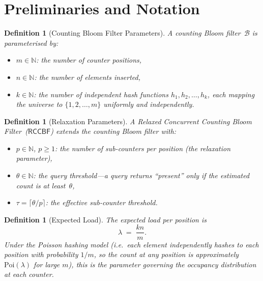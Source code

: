\documentclass[11pt,a4paper]{article}
\newtheorem{definition}[theorem]{Definition}
\newcommand{\RCCBF}{\textsf{RCCBF}}
\newcommand{\Poi}{\mathrm{Poi}}
\newcommand{\N}{\mathbb{N}}
\newcommand{\calB}{\mathcal{B}}
\begin{document}
\section{Preliminaries and Notation}\label{sec:prelims}

\begin{definition}[Counting Bloom Filter Parameters]\label{def:params}
A \emph{counting Bloom filter}~$\calB$ is parameterised by:
\begin{itemize}
  \item $m \in \N$: the number of counter positions,
  \item $n \in \N$: the number of elements inserted,
  \item $k \in \N$: the number of independent hash functions
        $h_1, h_2, \ldots, h_k$, each mapping the universe to
        $\{1,2,\ldots,m\}$ uniformly and independently.
\end{itemize}
\end{definition}

\begin{definition}[Relaxation Parameters]\label{def:relaxation}
A \emph{Relaxed Concurrent Counting Bloom Filter}~($\RCCBF$) extends the
counting Bloom filter with:
\begin{itemize}
  \item $p \in \N$, $p \ge 1$: the number of \emph{sub-counters} per
        position (the \emph{relaxation parameter}),
  \item $\theta \in \N$: the \emph{query threshold}—a query returns
        ``present'' only if the estimated count is at least~$\theta$,
  \item $\tau = \lceil \theta / p \rceil$: the \emph{effective sub-counter
        threshold}.
\end{itemize}
\end{definition}

\begin{definition}[Expected Load]\label{def:load}
The \emph{expected load} per position is
\begin{equation}\label{eq:lambda}
  \lambda \;=\; \frac{kn}{m}.
\end{equation}
Under the Poisson hashing model (i.e.\ each element independently hashes to
each position with probability $1/m$, so the count at any position is
approximately $\Poi(\lambda)$ for large $m$), this is the parameter
governing the occupancy distribution at each counter.
\end{definition}
\end{document}
